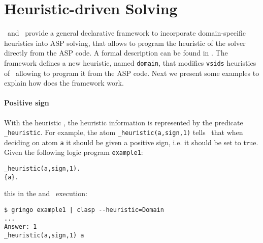 

\section{Heuristic-driven Solving}
\label{sec:heuristic}


%
%
%


\clasp\ and \clingo\ provide a general declarative framework to incorporate domain-specific heuristics into ASP solving,  
that allows to program the heuristic of the solver directly from the ASP code. 
A formal description can be found in \cite{gekaotroscwa13a}.
The framework defines a new heuristic, named \texttt{domain},  
that modifies \texttt{vsids} heuristics of \clasp\ allowing to program it from the ASP code.  
Next we present some examples to explain how does the framework work. 

\paragraph{Positive sign}

With the heuristic , the heuristic information is represented by the predicate \texttt{\_heuristic}.  
For example, the atom \texttt{\_heuristic(a,sign,1)} tells  \clasp\ that  when deciding on atom \texttt{a} 
it should be given a positive sign, i.e. it should be set to true.  
Given the following logic program \texttt{example1}:
\begin{verbatim}
_heuristic(a,sign,1).
{a}.
\end{verbatim}
this in the \gringo and \clasp\ execution:
\begin{verbatim}
$ gringo example1 | clasp --heuristic=Domain
...
Answer: 1    
_heuristic(a,sign,1) a
\end{verbatim}

